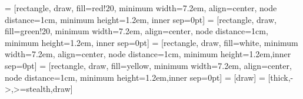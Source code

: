 
 = [rectangle, draw, fill=red!20, 
minimum width=7.2em, align=center, node distance=1cm, minimum height=1.2em, inner sep=0pt]
 = [rectangle, draw, fill=green!20, 
minimum width=7.2em, align=center, node distance=1cm, minimum height=1.2em, inner sep=0pt]
 = [rectangle, draw, fill=white, 
minimum width=7.2em, align=center, node distance=1cm, minimum height=1.2em,inner sep=0pt]
 = [rectangle, draw, fill=yellow, 
minimum width=7.2em, align=center, node distance=1cm, minimum height=1.2em,inner sep=0pt]
 = [draw]
 = [thick,->,>=stealth,draw]

